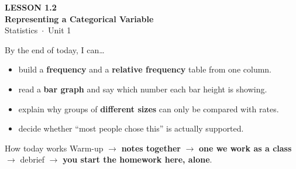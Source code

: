 \documentclass[aspectratio=169, 11pt]{beamer}
\begin{document}
{
\begin{frame}[plain]
  \vspace{2.8cm}\hspace{0.55cm}%
  \begin{minipage}{0.9\textwidth}
    {\color{goldacc}\bfseries\small LESSON 1.2}\\[0.5cm]
    {\color{white}\bfseries\LARGE Representing a Categorical Variable}\\[1.2cm]
    {\color{skymid}\small Statistics~$\cdot$~Unit 1}
  \end{minipage}
\end{frame}
}

\newcommand{\redink}[1]{{\color{redacc}\bfseries #1}}

\begin{frame}[t, plain]
  By the end of today, I can\ldots
  \begin{itemize}\setlength{\itemsep}{5pt}
    \item build a \textbf{frequency} and a \textbf{relative frequency} table from one column.
    \item read a \textbf{bar graph} and say which number each bar height is showing.
    \item explain why groups of \textbf{different sizes} can only be compared with rates.
    \item decide whether ``most people chose this'' is actually supported.
  \end{itemize}
  \begin{block}{How today works}
    Warm-up $\to$ \textbf{notes together} $\to$ \textbf{one we work as a class} $\to$
    debrief $\to$ \textbf{you start the homework here, alone}.
  \end{block}
\end{frame}
\end{document}
